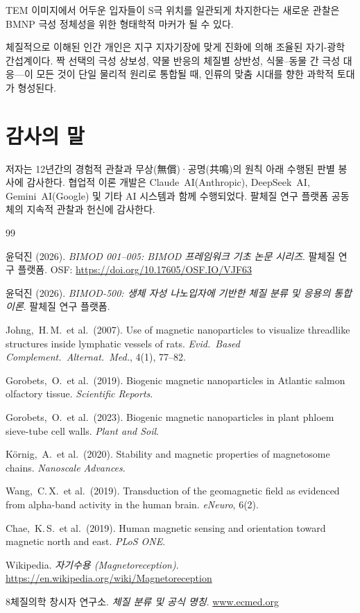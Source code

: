 \documentclass[12pt,a4paper]{article}
\begin{document}
TEM 이미지에서 어두운 입자들이 S극 위치를 일관되게 차지한다는 새로운 관찰은
BMNP 극성 정체성을 위한 형태학적 마커가 될 수 있다.

체질적으로 이해된 인간 개인은 지구 지자기장에 맞게 진화에 의해 조율된
자기-광학 간섭계이다.
짝 선택의 극성 상보성, 약물 반응의 체질별 상반성, 식물--동물 간 극성 대응---이 모든 것이
단일 물리적 원리로 통합될 때, 인류의 맞춤 시대를 향한 과학적 토대가 형성된다.

\section*{감사의 말}
저자는 12년간의 경험적 관찰과 무상(無償)·공명(共鳴)의 원칙 아래 수행된
판별 봉사에 감사한다.
협업적 이론 개발은 Claude~AI(Anthropic), DeepSeek~AI, Gemini~AI(Google) 및
기타 AI 시스템과 함께 수행되었다.
팔체질 연구 플랫폼 공동체의 지속적 관찰과 헌신에 감사한다.

\begin{thebibliography}{99}

윤덕진 (2026).
\textit{BIMOD 001--005: BIMOD 프레임워크 기초 논문 시리즈}.
팔체질 연구 플랫폼.
OSF: \url{https://doi.org/10.17605/OSF.IO/VJF63}

윤덕진 (2026).
\textit{BIMOD-500: 생체 자성 나노입자에 기반한 체질 분류 및 응용의 통합 이론}.
팔체질 연구 플랫폼.

Johng,~H.\,M.\ et al.\ (2007).
Use of magnetic nanoparticles to visualize threadlike structures inside
lymphatic vessels of rats.
\textit{Evid.\ Based Complement.\ Alternat.\ Med.}, 4(1), 77--82.

Gorobets,~O.\ et al.\ (2019).
Biogenic magnetic nanoparticles in Atlantic salmon olfactory tissue.
\textit{Scientific Reports}.

Gorobets,~O.\ et al.\ (2023).
Biogenic magnetic nanoparticles in plant phloem sieve-tube cell walls.
\textit{Plant and Soil}.

K\"{o}rnig,~A.\ et al.\ (2020).
Stability and magnetic properties of magnetosome chains.
\textit{Nanoscale Advances}.

Wang,~C.\,X.\ et al.\ (2019).
Transduction of the geomagnetic field as evidenced from alpha-band
activity in the human brain.
\textit{eNeuro}, 6(2).

Chae,~K.\,S.\ et al.\ (2019).
Human magnetic sensing and orientation toward magnetic north and east.
\textit{PLoS ONE}.

Wikipedia.
\textit{자기수용 (Magnetoreception)}.
\url{https://en.wikipedia.org/wiki/Magnetoreception}

8체질의학 창시자 연구소.
\textit{체질 분류 및 공식 명칭}.
\url{www.ecmed.org}

\end{thebibliography}
\end{document}
